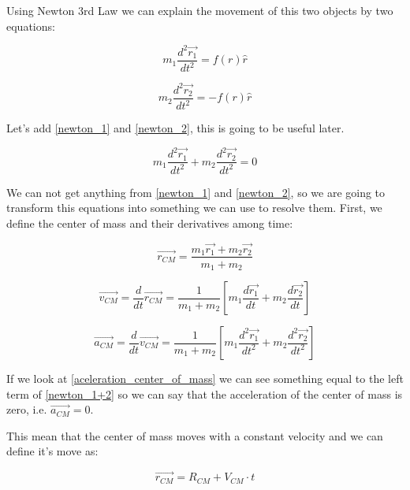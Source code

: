 Using Newton 3rd Law we can explain the movement of this two objects by two equations:

\begin{equation}
    \label{newton_1}
    m_1 \frac{d^2\vec{r_1}}{dt^2} = f(r)\hat{r}
\end{equation}

\begin{equation}
    \label{newton_2}
    m_2 \frac{d^2\vec{r_2}}{dt^2} = - f(r)\hat{r}
\end{equation}

Let's add \ref{newton_1} and \ref{newton_2}, this is going to be useful later.

\begin{equation}
    \label{newton_1+2}
    m_1\frac{d^2\vec{r_1}}{dt^2} + m_2\frac{d^2\vec{r_2}}{dt^2} = 0
\end{equation}

We can not get anything from \ref{newton_1} and \ref{newton_2}, so we are going to transform this equations into something we can use to resolve them. First, we define the center of mass and their derivatives among time:

\begin{equation}
    \label{center_of_mass}
    \vec{r_{CM}}=\frac{m_1\vec{r_1} + m_2\vec{r_2}}{m_1 + m_2}
\end{equation}

\begin{equation}
    \label{velocity_center_of_mass}
    \vec{v_{CM}}=\frac{d}{dt}\vec{r_{CM}} = \frac{1}{m_1 + m_2}\left[m_1\frac{d\vec{r_1}}{dt} + m_2\frac{d\vec{r_2}}{dt}  \right]
\end{equation}

\begin{equation}
    \label{aceleration_center_of_mass}
    \vec{a_{CM}}=\frac{d}{dt}\vec{v_{CM}} = \frac{1}{m_1 + m_2}\left[m_1\frac{d^2\vec{r_1}}{dt^2} + m_2\frac{d^2\vec{r_2}}{dt^2}  \right]
\end{equation}

If we look at \ref{aceleration_center_of_mass} we can see something equal to the left term of \ref{newton_1+2} so we can say that the acceleration of the center of mass is zero, i.e. $\vec{a_{CM}} = 0$.

This mean that the center of mass moves with a constant velocity and we can define it's move as:

\begin{equation}
    \label{center_of_mass_2}
    \vec{r_{CM}}= R_{CM} + V_{CM} \cdot t
\end{equation}

